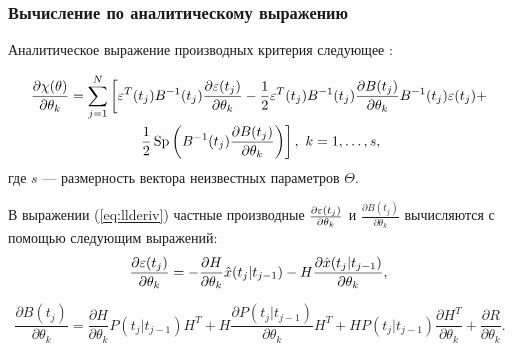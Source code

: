 \documentclass[a4paper,14pt]{extarticle}
\DeclareMathOperator{\Sp}{Sp}
\let\oldref\ref
\renewcommand{\ref}[1]{(\oldref{#1})}
\begin{document}
\subsubsection{Вычисление по аналитическому выражению}


Аналитическое выражение производных критерия следующее \cite{denisov}:

\begin{multline}
	\label{eq:llderiv}
	\frac{\partial \chi(\theta)}{\partial \theta_k} = \sum\limits^{N}_{j=1}
	\left[
	\eps^{T}(t_j) B^{-1}(t_j) \frac{\partial \eps(t_j)}{\partial \theta_k} -
	\frac{1}{2} \eps^{T}(t_j) B^{-1}(t_j) \frac{\partial B(t_j)}
	{\partial \theta_k}
	B^{-1}(t_j) \eps(t_j) + \right.\\\left.
	\frac{1}{2}
	\Sp \left( B^{-1}(t_j) \frac{\partial B(t_j)}{\partial \theta_k} \right)
	\right] ,\ k = 1,\ldots,s,
\end{multline}
где $s$ --- размерность вектора неизвестных параметров $\Theta$.

В выражении \ref{eq:llderiv} частные производные $\frac{\partial \varepsilon(t_j)}
{\partial \theta_k}$ и $\frac{\partial B(t_j)}{\partial \theta_k}$ вычисляются
с помощью следующим выражений:
\begin{equation}
\frac{\partial \varepsilon(t_j)}{\partial \theta_k} = - \frac{\partial H}
{\partial \theta_k} \hat{x}(t_j|t_{j-1}) - H \frac{\partial 
	\hat{x}(t_j|t_{j-1})}
{\partial \theta_k},\\
\end{equation}

\begin{equation}
\frac{\partial B(t_j)}{\partial \theta_k} = \frac{\partial H}
	{\partial \theta_k}
P(t_j|t_{j-1}) H^T + H \frac{\partial P(t_j|t_{j-1})}{\partial \theta_k} H^T +
H P(t_j|t_{j-1}) \frac{\partial H^T}{\partial \theta_k} + \frac{\partial R}
{\partial \theta_k}.
\end{equation}
\end{document}

